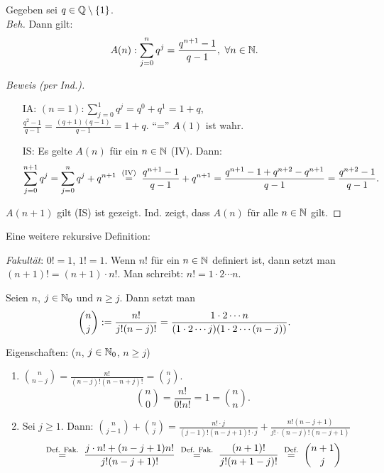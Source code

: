 \documentclass[12pt]{scrreprt}
\begin{document}
\begin{bsp}\label{bsp:vor.geomet-summe} 
Gegeben sei $q\in\mathbb{Q}\setminus \{1\}$.\\ \emph{Beh.} Dann gilt:
\[A(n): \sum_{j=0}^n q^j = \frac{q^{n+1}-1}{q-1},\ \forall n\in\mathbb{N}.\]
\begin{proof}[Beweis (per Ind.)]
\begin{enumerate}
\item[IA:] $\displaystyle (n = 1): \sum_{j=0}^1 q^j = q^0 + q^1 = 1+q$,\\
$\displaystyle \frac{q^2 - 1}{q-1} = \frac{(q+1)(q-1)}{q-1} = 1+q$.
"`="' \folgt $A(1)$ ist wahr.
\item[IS:] Es gelte $A(n)$ für ein $n\in\mathbb{N}$ (IV). Dann:
\[\displaystyle \sum_{j=0}^{n+1} q^j = \sum_{j=0}^n q^j + q^{n+1} \nach{=}{(IV)} \frac{q^{n+1}-1}{q-1} + q^{n+1} = \frac{q^{n+1}-1+q^{n+2}-q^{n+1}}{q-1} = \frac{q^{n+2}-1}{q-1}.\]
\end{enumerate}

\noindent\folgt $A(n+1)$ gilt \folgt (IS) ist gezeigt. 
\folgt Ind. zeigt, dass $A(n)$ für alle $n\in\mathbb{N}$ gilt.
\end{proof}

\noindent Eine weitere rekursive Definition:

\noindent \emph{Fakultät}: $0! = 1$, $1! = 1$.
Wenn $n!$ für ein $n\in\mathbb{N}$ definiert ist, dann setzt man $(n+1)! = (n+1)\cdot n!$.
Man schreibt: $n! = 1 \cdot 2 \dotsm n$.

\begin{dfn*}[Binomialkoeffizienten]
Seien $n$, $j\in\mathbb{N}_0$ und $n \geq j$.
Dann setzt man 
\[\binom{n}{j} := \frac{n!}{j!(n-j)!} = \frac{1\cdot 2\dotsm n}{(1\cdot 2\dotsm j)(1\cdot 2\dotsm (n-j))}.\]

\noindent Eigenschaften: ($n$, $j\in\mathbb{N}_0$, $n \geq j$)
\begin{enumerate}
\item $\displaystyle\binom{n}{n-j} = \frac{n!}{(n-j)!(n-n+j)!} = \binom{n}{j}.$
\begin{equation}\label{eqn:vor.n-ueber-n}
\displaystyle\binom{n}{0} = \frac{n!}{0!n!} = 1 = \binom{n}{n}.
\end{equation}

\item Sei $j \geq 1$. Dann: $\displaystyle\binom{n}{j-1}+\binom{n}{j} = \frac{n!\cdot j}{(j-1)!(n-j+1)!\cdot j} + \frac{n!(n-j+1)}{j!\cdot(n-j)!(n-j+1)}$
\begin{equation}\label{eqn:vor.np1-ueber-j}
\nach{=}{Def. Fak.} \frac{j\cdot n! + (n-j+1)n!}{j!(n-j+1)!} \nach{=}{Def. Fak.} \frac{(n+1)!}{j!(n+1-j)!} \nach{=}{Def.} \binom{n+1}{j}
\end{equation}
\end{enumerate}
\end{dfn*}
\end{bsp}
\end{document}
